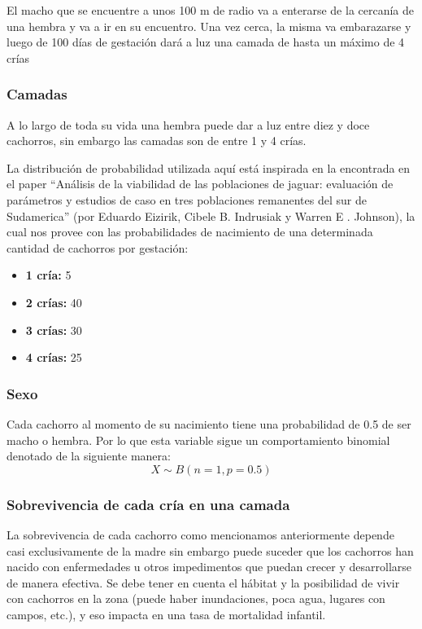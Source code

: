             El macho que se encuentre a unos 100 m de radio va a enterarse de la cercanía de una hembra y va a ir en su encuentro. Una vez cerca, la misma va embarazarse y luego de 100 días de gestación dará a luz una camada de hasta un máximo de 4 crías
        
        \subsubsection{Camadas}
            A lo largo de toda su vida una hembra puede dar a luz entre diez y doce cachorros, sin embargo las camadas son de entre 1 y 4 crías.
            
            La distribución de probabilidad utilizada aquí está inspirada en la encontrada en el paper “Análisis de la viabilidad de las poblaciones de jaguar: evaluación de parámetros y estudios de caso en tres poblaciones remanentes del sur de Sudamerica” (por Eduardo Eizirik, Cibele B. Indrusiak y Warren E . Johnson), la cual nos provee con las probabilidades de nacimiento de una determinada cantidad de cachorros por gestación:

            \begin{itemize}
                \item \textbf{1 cría:} 5%
                \item \textbf{2 crías:} 40%
                \item \textbf{3 crías:} 30%
                \item \textbf{4 crías:} 25%
            \end{itemize}
        \subsubsection{Sexo}
            Cada cachorro al momento de su nacimiento tiene una probabilidad de 0.5 de ser macho o hembra. Por lo que esta variable sigue un comportamiento binomial denotado de la siguiente manera:
            \begin{equation}
                X \sim B(n=1, p=0.5)
            \end{equation}
        \subsubsection{Sobrevivencia de cada cría en una camada}
            La sobrevivencia de cada cachorro como mencionamos anteriormente depende casi exclusivamente de la madre sin embargo puede suceder que los cachorros han nacido con enfermedades u otros impedimentos que puedan crecer y desarrollarse de manera efectiva. Se debe tener en cuenta el hábitat y la posibilidad de vivir con cachorros en la zona (puede haber inundaciones, poca agua, lugares con campos, etc.), y eso impacta en una tasa de mortalidad infantil.
            
